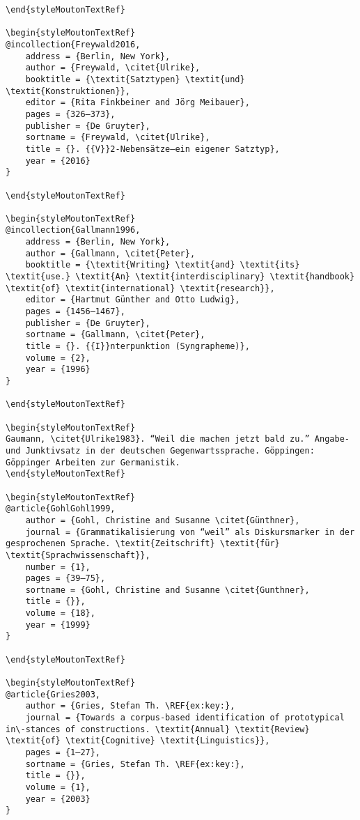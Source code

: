 \begin{styleMoutonHeadingRef}
\begin{verbatim}
\end{styleMoutonTextRef}

\begin{styleMoutonTextRef}
@incollection{Freywald2016,
	address = {Berlin, New York},
	author = {Freywald, \citet{Ulrike},
	booktitle = {\textit{Satztypen} \textit{und} \textit{Konstruktionen}},
	editor = {Rita Finkbeiner and Jörg Meibauer},
	pages = {326–373},
	publisher = {De Gruyter},
	sortname = {Freywald, \citet{Ulrike},
	title = {}. {{V}}2-Nebensätze—ein eigener Satztyp},
	year = {2016}
}

\end{styleMoutonTextRef}

\begin{styleMoutonTextRef}
@incollection{Gallmann1996,
	address = {Berlin, New York},
	author = {Gallmann, \citet{Peter},
	booktitle = {\textit{Writing} \textit{and} \textit{its} \textit{use.} \textit{An} \textit{interdisciplinary} \textit{handbook} \textit{of} \textit{international} \textit{research}},
	editor = {Hartmut Günther and Otto Ludwig},
	pages = {1456–1467},
	publisher = {De Gruyter},
	sortname = {Gallmann, \citet{Peter},
	title = {}. {{I}}nterpunktion (Syngrapheme)},
	volume = {2},
	year = {1996}
}

\end{styleMoutonTextRef}

\begin{styleMoutonTextRef}
Gaumann, \citet{Ulrike1983}. “Weil die machen jetzt bald zu.” Angabe- und Junktivsatz in der deutschen Gegenwartssprache. Göppingen: Göppinger Arbeiten zur Germanistik.
\end{styleMoutonTextRef}

\begin{styleMoutonTextRef}
@article{GohlGohl1999,
	author = {Gohl, Christine and Susanne \citet{Günthner},
	journal = {Grammatikalisierung von “weil” als Diskursmarker in der gesprochenen Sprache. \textit{Zeitschrift} \textit{für} \textit{Sprachwissenschaft}},
	number = {1},
	pages = {39–75},
	sortname = {Gohl, Christine and Susanne \citet{Gunthner},
	title = {}},
	volume = {18},
	year = {1999}
}

\end{styleMoutonTextRef}

\begin{styleMoutonTextRef}
@article{Gries2003,
	author = {Gries, Stefan Th. \REF{ex:key:},
	journal = {Towards a corpus-based identification of prototypical in\-stances of constructions. \textit{Annual} \textit{Review} \textit{of} \textit{Cognitive} \textit{Linguistics}},
	pages = {1–27},
	sortname = {Gries, Stefan Th. \REF{ex:key:},
	title = {}},
	volume = {1},
	year = {2003}
}


\end{verbatim}
\end{styleMoutonHeadingRef}
